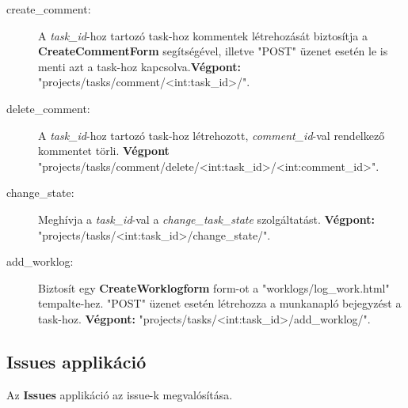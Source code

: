 \begin{itemize}
\begin{description}
		\item[create\_comment:] A \textit{task\_id}-hoz tartozó task-hoz kommentek létrehozását biztosítja a \textbf{CreateCommentForm} segítségével, illetve "POST" üzenet esetén le is menti azt a task-hoz kapcsolva.\textbf{Végpont:} "projects/tasks/comment/<int:task\_id>/".
		\item[delete\_comment:] A \textit{task\_id}-hoz tartozó task-hoz létrehozott, \textit{comment\_id}-val rendelkező kommentet törli. \textbf{Végpont} "projects/tasks/comment/delete/<int:task\_id>/<int:comment\_id>".
		\item[change\_state:] Meghívja a \textit{task\_id}-val a \textit{change\_task\_state} szolgáltatást. \textbf{Végpont:} "projects/tasks/<int:task\_id>/change\_state/".
		\item[add\_worklog:] Biztosít egy \textbf{CreateWorklogform} form-ot a "worklogs/log\_work.html" tempalte-hez. "POST" üzenet esetén létrehozza a munkanapló bejegyzést a task-hoz. \textbf{Végpont:} "projects/tasks/<int:task\_id>/add\_worklog/".
	\end{description}
\end{itemize}	

\subsection{Issues applikáció}

Az \textbf{Issues} applikáció az issue-k megvalósítása. 


